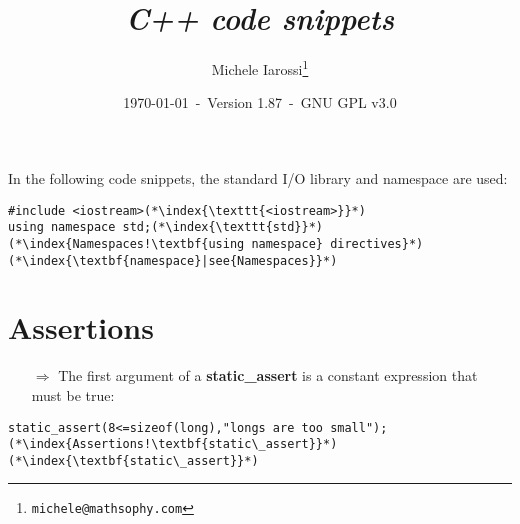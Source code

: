 \documentclass[10pt]{article}
\begin{document}
\title{\emph{C++ code snippets}}
\author{Michele Iarossi\thanks{\texttt{michele@mathsophy.com}}}
\date{\small \today~-~Version 1.87~-~GNU GPL v3.0}


\maketitle

\small

\begin{frame}{}
\setlength\columnsep{1cm}
\begin{multicols}{2}
\tableofcontents
\end{multicols}
\end{frame}
\newpage
\noindent
In the following code snippets, the standard I/O library and namespace are used:
\begin{lstlisting}
#include <iostream>(*\index{\texttt{<iostream>}}*)
using namespace std;(*\index{\texttt{std}}*)(*\index{Namespaces!\textbf{using namespace} directives}*)(*\index{\textbf{namespace}|see{Namespaces}}*)
\end{lstlisting}
%
%
\section{Assertions}
\small
\begin{enumerate}
\item[$\Rightarrow$] The first argument of a \textbf{static\_assert} is a constant expression that must be true:
\end{enumerate}
\begin{lstlisting}
static_assert(8<=sizeof(long),"longs are too small");(*\index{Assertions!\textbf{static\_assert}}*)(*\index{\textbf{static\_assert}}*)
\end{lstlisting}
%
%
\end{document}
